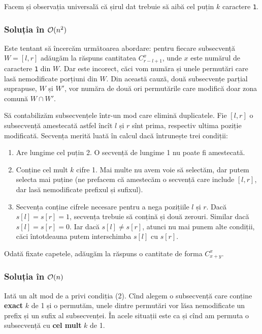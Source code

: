 \documentclass[../main.tex]{subfiles}
\begin{document}
Facem și observația universală că șirul dat trebuie să aibă cel puțin $k$ caractere \texttt{1}.
\subsubsection*{Soluția în \texorpdfstring{$\mathcal{O}(n^2)$}{O(n²)}}

Este tentant să încercăm următoarea abordare: pentru fiecare subsecvență $W = [l, r]$ adăugăm la răspuns cantitatea $C_{r-l+1}^x$, unde $x$ este numărul de caractere \texttt{1} din $W$. Dar este incorect, căci vom număra și unele permutări care lasă nemodificate porțiuni din $W$. Din această cauză, două subsecvențe parțial suprapuse, $W$ și $W'$, vor număra de două ori permutările care modifică doar zona comună $W \cap W'$.

Să contabilizăm subsecvențele într-un mod care elimină duplicatele. Fie $[l,r]$ o subsecvență amestecată astfel încît $l$ și $r$ sînt prima, respectiv ultima poziție modificată. Secvența merită luată în calcul dacă întrunește trei condiții:

\begin{enumerate}
  \item Are lungime cel puțin 2. O secvență de lungime 1 nu poate fi amestecată. 

  \item Conține cel mult $k$ cifre 1. Mai multe nu avem voie să selectăm, dar putem selecta mai puține (ne prefacem că amestecăm o secvență care include $[l,r]$, dar lasă nemodificate prefixul și sufixul).

  \item Secvența conține cifrele necesare pentru a nega pozițiile $l$ și $r$. Dacă $s[l] = s[r] = 1$, secvența trebuie să conțină și două zerouri. Similar dacă $s[l] = s[r] = 0$. Iar dacă $s[l] \neq s[r]$, atunci nu mai punem alte condiții, căci întotdeauna putem interschimba $s[l]$ cu $s[r]$.
\end{enumerate}

Odată fixate capetele, adăugăm la răspuns o cantitate de forma $C_{x+y}^x$.

\subsubsection*{Soluția în \texorpdfstring{$\mathcal{O}(n)$}{O(n)}}

Iată un alt mod de a privi condiția (2). Cînd alegem o subsecvență care conține \textbf{exact} $k$ de 1 și o permutăm, unele dintre permutări vor lăsa nemodificate un prefix și un sufix al subsecvenței. În acele situații este ca și cînd am permuta o subsecvență cu \textbf{cel mult} $k$ de 1.
\end{document}
